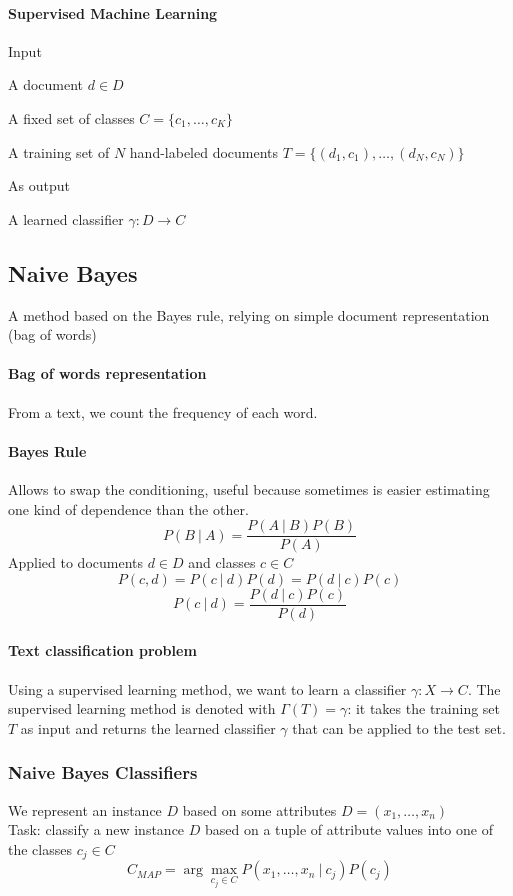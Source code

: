 \documentclass[10pt]{report}
\begin{document}
\paragraph{Supervised Machine Learning} Input \begin{list}{}{}
	\item A document $d\in D$
	\item A fixed set of classes $C=\{c_1,\ldots,c_K\}$
	\item A training set of $N$ hand-labeled documents $T=\{(d_1,c_1),\ldots,(d_N,c_N)\}$
\end{list}
As output\begin{list}{}{}
	\item A learned classifier $\gamma : D \rightarrow C$
\end{list}
\subsection{Naive Bayes}
A method based on the Bayes rule, relying on simple document representation (bag of words)
\paragraph{Bag of words representation} From a text, we count the frequency of each word.
\paragraph{Bayes Rule} Allows to swap the conditioning, useful because sometimes is easier estimating one kind of dependence than the other. $$P(B\:|\:A)=\frac{P(A\:|\:B)P(B)}{P(A)}$$
Applied to documents $d\in D$ and classes $c\in C$
$$P(c,d) = P(c\:|\:d)P(d) = P(d\:|\:c)P(c)$$
$$P(c\:|\:d) = \frac{P(d\:|\:c)P(c)}{P(d)}$$
\paragraph{Text classification problem} Using a supervised learning method, we want to learn a classifier $\gamma:X\rightarrow C$. The supervised learning method is denoted with $\Gamma(T)=\gamma$: it takes the training set $T$ as input and returns the learned classifier $\gamma$ that can be applied to the test set.
\subsubsection{Naive Bayes Classifiers}
We represent an instance $D$ based on some attributes $D=(x_1,\ldots, x_n)$\\Task: classify a new instance $D$ based on a tuple of attribute values into one of the classes $c_j\in C$
$$C_{MAP}=\arg\max_{c_j\in C} P(x_1,\ldots,x_n\:|\:c_j)P(c_j)$$
\end{document}
